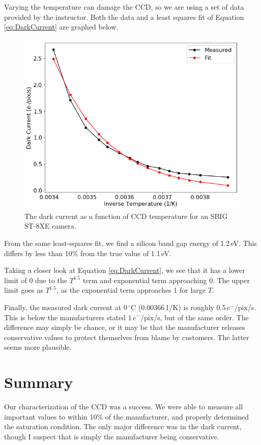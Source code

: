 \documentclass[12pt,letterpaper]{report}
\begin{document}
Varying the temperature can damage the CCD, so we are using a set of data provided by the instructor. Both the data and a least squares fit of Equation \ref{eq:DarkCurrent} are graphed below.

\begin{figure}[H]
	\centering
	\includegraphics[width=0.8\linewidth]{DarkCurrent.png}
	\caption{The dark current as a function of CCD temperature for an SBIG ST-8XE camera.}
	\label{fig:DarkCurrent}
\end{figure}

From the same least-squares fit, we find a silicon band gap energy of 1.2$\,$eV. This differs by less than 10\% from the true value of 1.1$\,$eV.

Taking a closer look at Equation \ref{eq:DarkCurrent}, we see that it has a lower limit of 0 due to the $T^{1.5}$ term and exponential term approaching 0. The upper limit goes as $T^{1.5}$, as the exponential term approaches 1 for large $T$.

Finally, the measured dark current at 0$\,^{\circ}$C (0.00366$\,$1/K) is roughly 0.5$\,e^-$/pix/s. This is below the manufacturers stated 1$\,e^-$/pix/s, but of the same order. The difference may simply be chance, or it may be that the manufacturer releases conservative values to protect themselves from blame by customers. The latter seems more plausible.

\section*{Summary}

Our characterization of the CCD was a success. We were able to measure all important values to within 10\% of the manufacturer, and properly determined the saturation condition. The only major difference was in the dark current, though I suspect that is simply the manufacturer being conservative.
\end{document}
